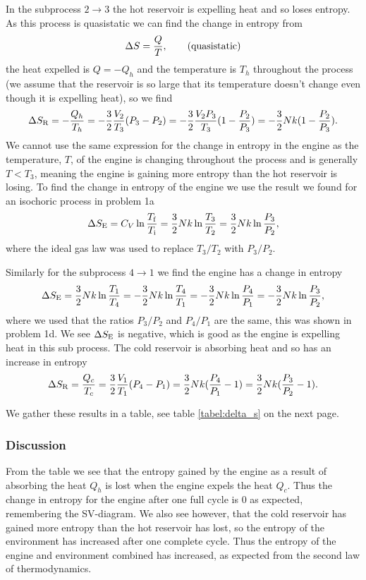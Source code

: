 \documentclass[a4paper, 11pt, titlepage, english]{article}
\begin{document}
In the subprocess $2\rightarrow3$ the hot reservoir is expelling heat and so loses entropy. As this process is quasistatic we can find the change in entropy from
$$\Delta S = \frac{Q}{T}, \qquad {(\rm quasistatic)}$$
the heat expelled is $Q = -Q_h$ and the temperature is $T_h$ throughout the process (we assume that the reservoir is so large that its temperature doesn't change even though it is expelling heat), so we find
$$\Delta S_{\rm R} = -\frac{Q_h}{T_h} = -\frac{3}{2}\frac{V_2}{T_3}(P_3-P_2) = -\frac{3}{2}\frac{V_2P_3}{T_3}(1 - \frac{P_2}{P_3}) = -\frac{3}{2}Nk(1 - \frac{P_2}{P_3}).$$
We cannot use the same expression for the change in entropy in the engine as the temperature, $T$, of the engine is changing throughout the process and is generally $T < T_3$, meaning the engine is gaining more entropy than the hot reservoir is losing. To find the change in entropy of the engine we use the result we found for an isochoric process in problem 1a
$$\Delta S_{\rm E} = C_V \ln \frac{T_{\rm f}}{T_{\rm i}} = \frac{3}{2}Nk \ln \frac{T_3}{T_2} = \frac{3}{2}Nk \ln \frac{P_3}{P_2},$$
where the ideal gas law was used to replace $T_3/T_2$ with $P_3/P_2$.

Similarly for the subprocess $4\rightarrow1$ we find the engine has a change in entropy
$$\Delta S_{\rm E} = \frac{3}{2}Nk \ln \frac{T_1}{T_4} = -\frac{3}{2}Nk \ln \frac{T_4}{T_1} = -\frac{3}{2}Nk \ln \frac{P_4}{P_1} = -\frac{3}{2}Nk \ln \frac{P_3}{P_2},$$
where we used that the ratios $P_3/P_2$ and $P_4/P_1$ are the same, this was shown in problem 1d. We see $\Delta S_{\rm E}$ is negative, which is good as the engine is expelling heat in this sub process. The cold reservoir is absorbing heat and so has an increase in entropy
$$\Delta S_{\rm R} = \frac{Q_c}{T_c} = \frac{3}{2}\frac{V_1}{T_1}(P_4 - P_1) = \frac{3}{2}Nk(\frac{P_4}{P_1} - 1) = \frac{3}{2}Nk(\frac{P_3}{P_2}-1).$$

We gather these results in a table, see table \ref{tabel:delta_s} on the next page. 

\subsubsection*{Discussion}
From the table we see that the entropy gained by the engine as a result of absorbing the heat $Q_h$ is lost when the engine expels the heat $Q_c$. Thus the change in entropy for the engine after one full cycle is $0$ as expected, remembering the SV-diagram. We also see however, that the cold reservoir has gained more entropy than the hot reservoir has lost, so the entropy of the environment has increased after one complete cycle. Thus the entropy of the engine and environment combined has increased, as expected from the second law of thermodynamics.
\end{document}
